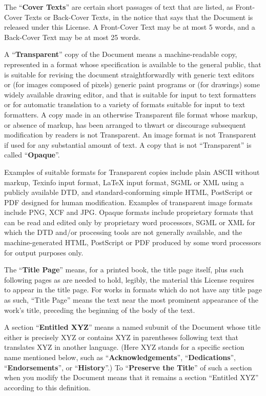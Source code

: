\documentclass[a4paper,spanish,12pt]{book}
\begin{document}
The ``\textbf{Cover Texts}'' are certain short passages of text that are listed,
as Front-Cover Texts or Back-Cover Texts, in the notice that says that
the Document is released under this License.  A Front-Cover Text may
be at most 5 words, and a Back-Cover Text may be at most 25 words.

A ``\textbf{Transparent}'' copy of the Document means a machine-readable copy,
represented in a format whose specification is available to the
general public, that is suitable for revising the document
straightforwardly with generic text editors or (for images composed of
pixels) generic paint programs or (for drawings) some widely available
drawing editor, and that is suitable for input to text formatters or
for automatic translation to a variety of formats suitable for input
to text formatters.  A copy made in an otherwise Transparent file
format whose markup, or absence of markup, has been arranged to thwart
or discourage subsequent modification by readers is not Transparent.
An image format is not Transparent if used for any substantial amount
of text.  A copy that is not ``Transparent'' is called ``\textbf{Opaque}''.

Examples of suitable formats for Transparent copies include plain
ASCII without markup, Texinfo input format, LaTeX input format, SGML
or XML using a publicly available DTD, and standard-conforming simple
HTML, PostScript or PDF designed for human modification.  Examples of
transparent image formats include PNG, XCF and JPG.  Opaque formats
include proprietary formats that can be read and edited only by
proprietary word processors, SGML or XML for which the DTD and/or
processing tools are not generally available, and the
machine-generated HTML, PostScript or PDF produced by some word
processors for output purposes only.

The ``\textbf{Title Page}'' means, for a printed book, the title page itself,
plus such following pages as are needed to hold, legibly, the material
this License requires to appear in the title page.  For works in
formats which do not have any title page as such, ``Title Page'' means
the text near the most prominent appearance of the work's title,
preceding the beginning of the body of the text.

A section ``\textbf{Entitled XYZ}'' means a named subunit of the Document whose
title either is precisely XYZ or contains XYZ in parentheses following
text that translates XYZ in another language.  (Here XYZ stands for a
specific section name mentioned below, such as ``\textbf{Acknowledgements}'',
``\textbf{Dedications}'', ``\textbf{Endorsements}'', or ``\textbf{History}''.)  
To ``\textbf{Preserve the Title}''
of such a section when you modify the Document means that it remains a
section ``Entitled XYZ'' according to this definition.
\end{document}
